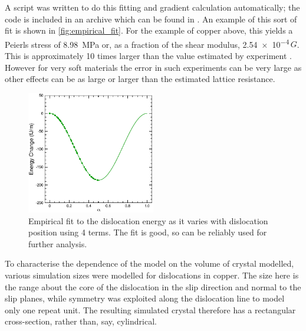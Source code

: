 A script was written to do this fitting and gradient calculation automatically; the code is included in an archive which can be found in \cite{code}. An example of this sort of fit is shown in \autoref{fig:empirical_fit}. For the example of copper above, this yields a Peierls stress of \SI{8.98}{\mega\pascal} or, as a fraction of the shear modulus, \num{2.54e-4}\,$G$. This is approximately 10 times larger than the value estimated by experiment \cite{Wang1996}. However for very soft materials the error in such experiments can be very large as other effects can be as large or larger than the estimated lattice resistance.

\begin{figure}
\centering
\includegraphics[width=0.5\textwidth]{Empirical_Fit}
\caption[Empirical fit to the variation in energy with dislocation position.]{Empirical fit to the dislocation energy as it varies with dislocation position using 4 terms. The fit is good, so can be reliably used for further analysis.\label{fig:empirical_fit}}
\end{figure}


To characterise the dependence of the model on the volume of crystal modelled, various simulation sizes were modelled for dislocations in copper. The size here is the range about the core of the dislocation in the slip direction and normal to the slip planes, while symmetry was exploited along the dislocation line to model only one repeat unit. The resulting simulated crystal therefore has a rectangular cross-section, rather than, say, cylindrical.


